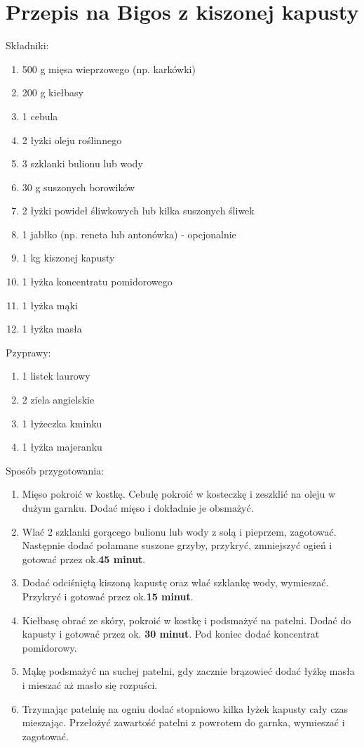 \documentclass[12pt, letterpaper, titlepage]{article}
\begin{document}
\section{Przepis na Bigos z kiszonej kapusty}
Składniki:
\begin{enumerate}
\item 500 g mięsa wieprzowego (np. karkówki)
\item 200 g kiełbasy
\item 1 cebula
\item 2 łyżki oleju roślinnego
\item 3 szklanki bulionu lub wody
\item 30 g suszonych borowików
\item 2 łyżki powideł śliwkowych lub kilka suszonych śliwek
\item 1 jabłko (np. reneta lub antonówka) - opcjonalnie
\item 1 kg kiszonej kapusty
\item 1 łyżka koncentratu pomidorowego
\item 1 łyżka mąki
\item 1 łyżka masła
\end{enumerate}
Pzyprawy:
\begin{enumerate}
\item 1 listek laurowy
\item 2 ziela angielskie
\item 1 łyżeczka kminku
\item 1 łyżka majeranku
\end{enumerate}
Sposób przygotowania:
\begin{enumerate}[•]
\item Mięso pokroić w kostkę. Cebulę pokroić w kosteczkę i zeszklić na oleju w dużym garnku. Dodać mięso i dokładnie je obsmażyć.
\item Wlać 2 szklanki gorącego bulionu lub wody z solą i pieprzem, zagotować. Następnie dodać połamane suszone grzyby, przykryć, zmniejszyć ogień i gotować przez ok.\textbf{45 minut}.
\item Dodać odciśniętą kiszoną kapustę oraz wlać szklankę wody, wymieszać. Przykryć i gotować przez ok.\textbf{15 minut}.
\item 	Kiełbasę obrać ze skóry, pokroić w kostkę i podsmażyć na patelni. Dodać do kapusty i gotować przez ok. \textbf{30 minut}. Pod koniec dodać koncentrat pomidorowy.
\item Mąkę podsmażyć na suchej patelni, gdy zacznie brązowieć dodać łyżkę masła i mieszać aż masło się rozpuści.
\item  Trzymając patelnię na ogniu dodać stopniowo kilka łyżek kapusty cały czas mieszając. Przełożyć zawartość patelni z powrotem do garnka, wymieszać i zagotować.
\end{enumerate}
\end{document}
